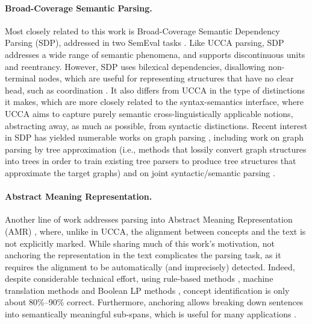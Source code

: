 \documentclass[11pt,a4paper]{article}
\newcommand{\secref}[1]{Section~\ref{#1}}
\begin{document}
\paragraph{Broad-Coverage Semantic Parsing.}
Most closely related to this work is Broad-Coverage Semantic Dependency Parsing (SDP),
addressed in two SemEval tasks \cite{oepen2014semeval,oepen2015semeval}.
Like UCCA parsing, SDP addresses a wide range of semantic phenomena,
and supports discontinuous units and reentrancy.
However, SDP uses bilexical dependencies, disallowing non-terminal nodes, which
are useful for representing structures that have no clear head, such as coordination
\cite[see \secref{sec:introduction}]{Ivanova2012who}. It also differs from UCCA in the type
of distinctions it makes, which are more closely related to the syntax-semantics interface,
where UCCA aims to capture purely semantic cross-linguistically applicable notions, abstracting
away, as much as possible, from syntactic distinctions.
Recent interest in SDP has yielded numerable works on graph parsing
\cite{ribeyre-villemontedelaclergerie-seddah:2014:SemEval,thomson-EtAl:2014:SemEval,almeida-martins:2015:SemEval,du-EtAl:2015:SemEval}, including work on graph parsing
by tree approximation (i.e., methods that lossily convert graph structures
into trees in order to train existing tree parsers to produce tree structures
that approximate the target graphs) \cite{agic-koller:2014:SemEval,schluter-EtAl:2014:SemEval}
and on joint syntactic/semantic parsing
\cite{henderson2013multilingual,swayamdipta-EtAl:2016:CoNLL}.

\paragraph{Abstract Meaning Representation.}
Another line of work addresses parsing into Abstract Meaning Representation (AMR)
\cite{flanigan2014discriminative,vanderwende2015amr,pust2015parsing,artzi2015broad},
where, unlike in UCCA, the alignment between concepts and the text is not explicitly marked.
While sharing much of this work's motivation, not anchoring the representation in the text
complicates the parsing task, as it requires
the alignment to be automatically (and imprecisely) detected.
Indeed, despite considerable technical effort,
using rule-based methods \cite{flanigan2014discriminative}, machine
translation methods \cite{pourdamghani2014aligning} and Boolean LP methods
\cite{werling2015robust}, concept identification is only about 80\%--90\% correct.
Furthermore, anchoring allows breaking down sentences into semantically meaningful sub-spans,
which is useful for many applications \cite{fernandez2015parsing,birch2016hume}.
\end{document}
